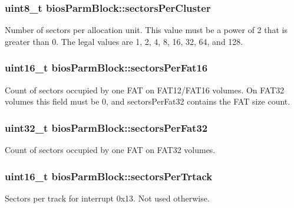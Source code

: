 \subsubsection[{sectors\+Per\+Cluster}]{\setlength{\rightskip}{0pt plus 5cm}uint8\+\_\+t bios\+Parm\+Block\+::sectors\+Per\+Cluster}\label{structbios_parm_block_a45d5e2d8c93a028a074e8ce3dc751ab5}
Number of sectors per allocation unit. This value must be a power of 2 that is greater than 0. The legal values are 1, 2, 4, 8, 16, 32, 64, and 128. \hypertarget{structbios_parm_block_a24d6e5a9069491d5db6dbe747336985b}{}
\subsubsection[{sectors\+Per\+Fat16}]{\setlength{\rightskip}{0pt plus 5cm}uint16\+\_\+t bios\+Parm\+Block\+::sectors\+Per\+Fat16}\label{structbios_parm_block_a24d6e5a9069491d5db6dbe747336985b}
Count of sectors occupied by one F\+A\+T on F\+A\+T12/\+F\+A\+T16 volumes. On F\+A\+T32 volumes this field must be 0, and sectors\+Per\+Fat32 contains the F\+A\+T size count. \hypertarget{structbios_parm_block_ad80429df03a6b80f79b18cb6e1008d64}{}
\subsubsection[{sectors\+Per\+Fat32}]{\setlength{\rightskip}{0pt plus 5cm}uint32\+\_\+t bios\+Parm\+Block\+::sectors\+Per\+Fat32}\label{structbios_parm_block_ad80429df03a6b80f79b18cb6e1008d64}
Count of sectors occupied by one F\+A\+T on F\+A\+T32 volumes. \hypertarget{structbios_parm_block_a7c27cb7f66c2c9d5266d896e8df227c7}{}
\subsubsection[{sectors\+Per\+Trtack}]{\setlength{\rightskip}{0pt plus 5cm}uint16\+\_\+t bios\+Parm\+Block\+::sectors\+Per\+Trtack}\label{structbios_parm_block_a7c27cb7f66c2c9d5266d896e8df227c7}
Sectors per track for interrupt 0x13. Not used otherwise. \hypertarget{structbios_parm_block_a686c686fde2fb109bea120f2f434db87}{}
